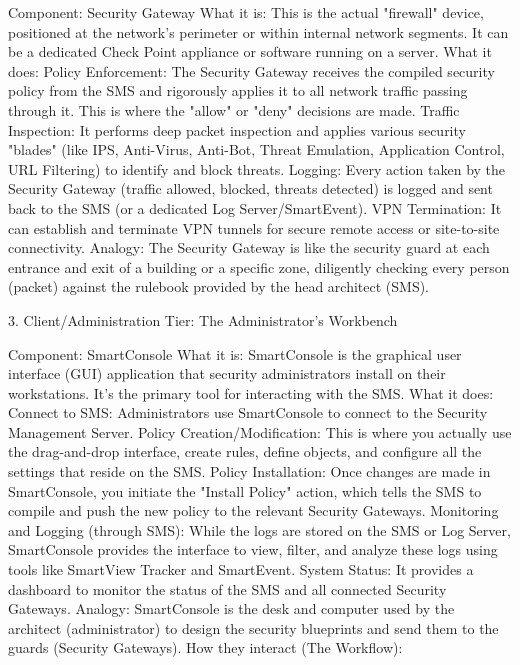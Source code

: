 Component: Security Gateway
What it is: This is the actual "firewall" device, positioned at the network's perimeter or within internal network segments. It can be a dedicated Check Point appliance or software running on a server.
What it does:
Policy Enforcement: The Security Gateway receives the compiled security policy from the SMS and rigorously applies it to all network traffic passing through it. This is where the "allow" or "deny" decisions are made.
Traffic Inspection: It performs deep packet inspection and applies various security "blades" (like IPS, Anti-Virus, Anti-Bot, Threat Emulation, Application Control, URL Filtering) to identify and block threats.
Logging: Every action taken by the Security Gateway (traffic allowed, blocked, threats detected) is logged and sent back to the SMS (or a dedicated Log Server/SmartEvent).
VPN Termination: It can establish and terminate VPN tunnels for secure remote access or site-to-site connectivity.
Analogy: The Security Gateway is like the security guard at each entrance and exit of a building or a specific zone, diligently checking every person (packet) against the rulebook provided by the head architect (SMS).

3. Client/Administration Tier: The Administrator's Workbench

Component: SmartConsole
What it is: SmartConsole is the graphical user interface (GUI) application that security administrators install on their workstations. It's the primary tool for interacting with the SMS.
What it does:
Connect to SMS: Administrators use SmartConsole to connect to the Security Management Server.
Policy Creation/Modification: This is where you actually use the drag-and-drop interface, create rules, define objects, and configure all the settings that reside on the SMS.
Policy Installation: Once changes are made in SmartConsole, you initiate the "Install Policy" action, which tells the SMS to compile and push the new policy to the relevant Security Gateways.
Monitoring and Logging (through SMS): While the logs are stored on the SMS or Log Server, SmartConsole provides the interface to view, filter, and analyze these logs using tools like SmartView Tracker and SmartEvent.
System Status: It provides a dashboard to monitor the status of the SMS and all connected Security Gateways.
Analogy: SmartConsole is the desk and computer used by the architect (administrator) to design the security blueprints and send them to the guards (Security Gateways).
How they interact (The Workflow):

